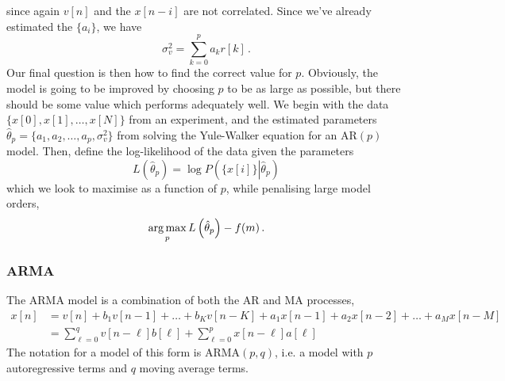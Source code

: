 %
since again $v[n]$ and the $x[n-i]$ are not correlated. Since we've already
estimated the $\{a_i\}$, we have
%
\begin{displaymath}
  \sigma_v^2 = \sum_{k=0}^p a_kr[k] \,.
\end{displaymath}
%
Our final question is then how to find the correct value for $p$.
Obviously, the model is going to be improved by choosing $p$ to
be as large as possible, but there should be some value which
performs adequately well. We begin with the data
$\{x[0], x[1], \hdots, x[N]\}$ from an experiment, and the
estimated parameters
$\hat{\theta}_p = \{a_1, a_2, \hdots, a_p, \sigma_v^2\}$ from solving
the Yule-Walker equation for an AR$(p)$ model. Then, define the
log-likelihood of the data given the parameters
%
\begin{displaymath}
  L\left(\hat{\theta}_p\right) =
  \log P\left(\{x[i]\} \left|\hat{\theta}_p\right.\right)
\end{displaymath}
%
which we look to maximise as a function of $p$, while penalising
large model orders,
%
\begin{displaymath}
  \operatorname*{arg\,max}_{p} L\left(\hat{\theta}_p\right) - f(m) \,.
\end{displaymath}

\subsubsection{ARMA}
%
The ARMA model is a combination of both the AR and MA processes,
%
\begin{align*}
  x[n] &= v[n] + b_1v[n-1] + \hdots + b_Kv[n-K] + a_1x[n-1] + a_2x[n-2] + \hdots + a_Mx[n-M] \\
  &= \sum_{\ell=0}^q v[n-\ell]b[\ell] + \sum_{\ell=0}^p x[n-\ell]a[\ell]
\end{align*}
%
The notation for a model of this form is ARMA$(p,q)$, i.e. a model with
$p$ autoregressive terms and $q$ moving average terms.
